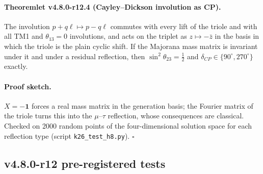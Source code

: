 \paragraph{Theoremlet v4.8.0-r12.4 (Cayley--Dickson involution as CP).}
The involution \(p+q\ell\mapsto p-q\ell\) commutes with every lift of the triole and with all TM1 and
\(\theta_{13}=0\) involutions, and acts on the triplet as \(z\mapsto-\bar z\) in the basis in which the
triole is the plain cyclic shift.  If the Majorana mass matrix is invariant under it and under a residual
reflection, then \(\sin^2\theta_{23}=\tfrac12\) and \(\delta_{CP}\in\{90^\circ,270^\circ\}\) exactly.

\paragraph{Proof sketch.}
\(X=-\mathbf1\) forces a real mass matrix in the generation basis; the Fourier matrix of the triole turns
this into the \(\mu\)--\(\tau\) reflection, whose consequences are classical.  Checked on 2000 random
points of the four-dimensional solution space for each reflection type (script \texttt{k26\_test\_h8.py}).
\(\square\)

\subsection*{v4.8.0-r12 pre-registered tests}
\label{subsec:v480-r12-tests}


